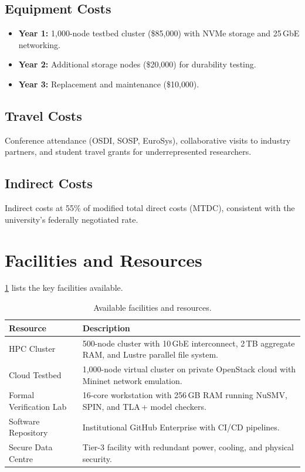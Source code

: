 \documentclass[
    language=english,
    doctype=grant-proposal,
    institution=none,
]{../../omnilatex}
\begin{document}
\subsection{Equipment Costs}
\begin{itemize}
    \item \textbf{Year 1:} 1{,}000-node testbed cluster (\$85{,}000)
          with NVMe storage and 25\,GbE networking.
    \item \textbf{Year 2:} Additional storage nodes (\$20{,}000)
          for durability testing.
    \item \textbf{Year 3:} Replacement and maintenance (\$10{,}000).
\end{itemize}

\subsection{Travel Costs}
Conference attendance (OSDI, SOSP, EuroSys), collaborative visits to
industry partners, and student travel grants for underrepresented
researchers.

\subsection{Indirect Costs}
Indirect costs at 55\% of modified total direct costs (MTDC), consistent
with the university's federally negotiated rate.

\newpage

\section*{Facilities and Resources}

\cref{tab:facilities} lists the key facilities available.

\begin{table}[htbp]
    \centering
    \caption{Available facilities and resources.}
    \label{tab:facilities}
    \begin{tabular}{@{}lp{9cm}@{}}
        \toprule
        \textbf{Resource} & \textbf{Description} \\
        \midrule
        HPC Cluster
            & 500-node cluster with 10\,GbE interconnect,
              2\,TB aggregate RAM, and Lustre parallel file system. \\
        Cloud Testbed
            & 1{,}000-node virtual cluster on private OpenStack cloud
              with Mininet network emulation. \\
        Formal Verification Lab
            & 16-core workstation with 256\,GB RAM running NuSMV,
              SPIN, and TLA\,+ model checkers. \\
        Software Repository
            & Institutional GitHub Enterprise with CI/CD pipelines. \\
        Secure Data Centre
            & Tier-3 facility with redundant power, cooling, and
              physical security. \\
        \bottomrule
    \end{tabular}
\end{table}
\end{document}
